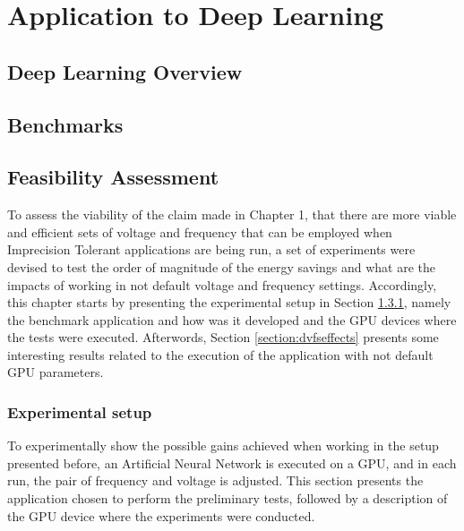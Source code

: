 
\chapter{Application to Deep Learning}
\label{chapter:application}

\section{Deep Learning Overview}
\section{Benchmarks}
\section{Feasibility Assessment}
To assess the viability of the claim made in Chapter 1, that there are more viable and efficient sets of voltage and frequency that can be employed when Imprecision Tolerant applications are being run, a set of experiments were devised to test the order of magnitude of the energy savings and what are the impacts of working in not default voltage and frequency settings. Accordingly, this chapter starts by presenting the experimental setup in Section \ref{section:experimental_setup}, namely the benchmark application and how was it developed and the GPU devices where the tests were executed. Afterwords, Section \ref{section:dvfseffects} presents some interesting results related to the execution of the application with not default GPU parameters.


\subsection{Experimental setup}
\label{section:experimental_setup}

To experimentally show the possible gains achieved when working in the setup presented before, an Artificial Neural Network is executed on a GPU, and in each run, the pair of frequency and voltage is adjusted. This section presents the application chosen to perform the preliminary tests, followed by a description of the GPU device where the experiments were conducted.

